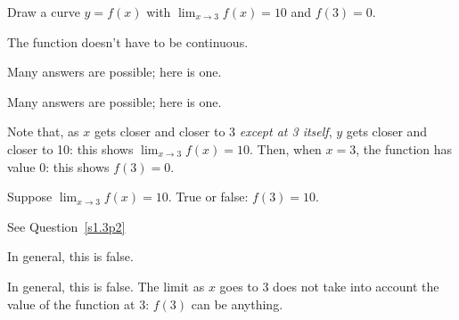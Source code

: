 \begin{Mquestion}\label{s1.3p2}
Draw a curve $y=f(x)$ with $\displaystyle\lim_{x \rightarrow 3}f(x)=10$ and $f(3)=0$.
\end{Mquestion}
\begin{hint}
The function doesn't have to be continuous.
\end{hint}
\begin{answer}
Many answers are possible; here is one.
\begin{center}
\end{center}
\end{answer}
\begin{solution}
Many answers are possible; here is one.
\begin{center}
\end{center}

Note that, as $x$ gets closer and closer to 3 \emph{except at 3 itself}, $y$ gets closer and closer to 10: this shows $\displaystyle\lim_{x \rightarrow 3} f(x)=10$.  Then, when $x=3$, the function has value 0: this shows $f(3)=0$.
\end{solution}

\begin{question}
Suppose $\displaystyle\lim_{x \rightarrow 3} f(x)=10$. True or false: $f(3)=10$.
\end{question}
\begin{hint}
See Question~\ref{s1.3p2}
\end{hint}
\begin{answer} In general, this is false.
\end{answer}
\begin{solution} In general, this is false. The limit as $x$ goes to 3 does not take into account the value of the function at 3: $f(3)$ can be anything.
\end{solution}

